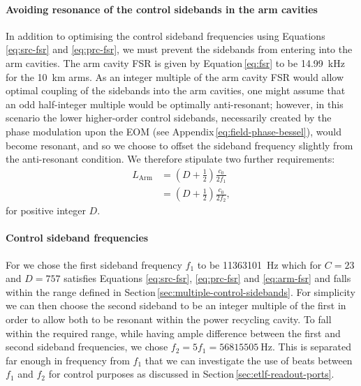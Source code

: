 \paragraph{Avoiding resonance of the control sidebands in the arm cavities}
In addition to optimising the control sideband frequencies using Equations \ref{eq:src-fsr} and \ref{eq:prc-fsr}, we must prevent the sidebands from entering into the arm cavities. The arm cavity \gls{FSR} is given by Equation\,\ref{eq:fsr} to be \SI{14.99}{\kilo\hertz} for the \SI{10}{\kilo\meter} arms. As an integer multiple of the arm cavity \gls{FSR} would allow optimal coupling of the sidebands into the arm cavities, one might assume that an odd half-integer multiple would be optimally anti-resonant; however, in this scenario the lower higher-order control sidebands, necessarily created by the phase modulation upon the \gls{EOM} (see Appendix\,\ref{eq:field-phase-bessel}), would become resonant, and so we choose to offset the sideband frequency slightly from the anti-resonant condition. We therefore stipulate two further requirements:
\begin{equation}
  \label{eq:arm-fsr}
  \begin{split}
    L_{\text{Arm}} &= \left(D + \frac{1}{2} \right) \frac{c_0}{2 f_1} \\
                   &= \left(D + \frac{1}{2} \right) \frac{c_0}{2 f_2},
  \end{split}
\end{equation}
for positive integer $D$.

\paragraph{Control sideband frequencies}
For \ETLF{} we chose the first sideband frequency $f_1$ to be \SI{11363101}{\hertz} which for $C = 23$ and $D = 757$ satisfies Equations \ref{eq:src-fsr}, \ref{eq:prc-fsr} and \ref{eq:arm-fsr} and falls within the range defined in Section\,\ref{sec:multiple-control-sidebands}. For simplicity we can then choose the second sideband to be an integer multiple of the first in order to allow both to be resonant within the power recycling cavity. To fall within the required range, while having ample difference between the first and second sideband frequencies, we chose $f_2 = 5f_1 = \SI{56815505}{\hertz}$. This is separated far enough in frequency from $f_1$ that we can investigate the use of beats between $f_1$ and $f_2$ for control purposes as discussed in Section\,\ref{sec:etlf-readout-ports}.

